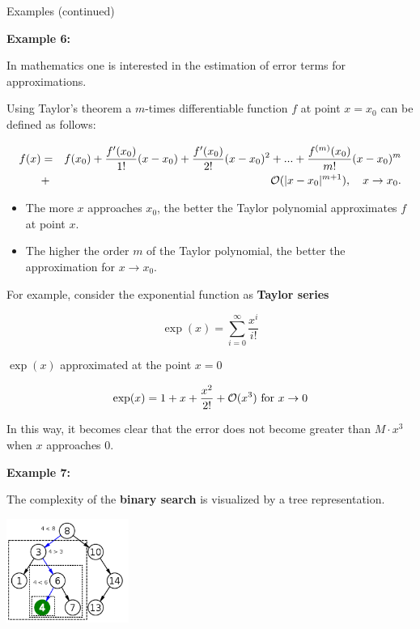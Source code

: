 \documentclass[11pt,compress,t,notes=noshow, xcolor=table]{beamer}
\begin{document}
\begin{vbframe}{Examples (continued)}
\framebreak

\textbf{Example 6:}

In mathematics one is interested in the estimation of error terms for approximations.

Using Taylor's theorem a $m$-times differentiable function $f$ at point $x = x_0$ can be defined as follows:

\begin{footnotesize}
\begin{eqnarray*}
f(x) &=& f(x_0) + \frac{f'(x_0)}{1!}(x - x_0) +  \frac{f'(x_0)}{2!}(x - x_0)^2 + ... +  \frac{f^{(m)}(x_0)}{m!}(x - x_0)^m \\
&+& \mathcal{O}(|x - x_0|^{m + 1}), \quad x\to x_0.
\end{eqnarray*}
\end{footnotesize}

\begin{itemize}
\item The more $x$ approaches $x_0$, the better the Taylor polynomial approximates $f$ at point $x$.
\item The higher the order $m$ of the Taylor polynomial, the better the approximation for $x \to x_0$.
\end{itemize}


\framebreak

For example, consider the exponential function as \textbf{Taylor series}

$$
\exp(x) = \sum_{i=0}^\infty \frac{x^i}{i!}
$$

$\exp(x)$ approximated at the point $x=0$

$$
\exp(x) = 1 + x + \frac{x^2}{2!} + \mathcal{O}(x^3) \text{ for } x \rightarrow 0
$$

In this way, it becomes clear that the error does not become greater than
$M \cdot x^3$ when $x$ approaches $0$.

\framebreak

\textbf{Example 7:}

The complexity of the \textbf{binary search} is visualized by a tree representation.

\begin{center}
  \includegraphics[width=0.3\textwidth]{figure_man/binarysearch.png}
\end{center}


\end{vbframe}
\end{document}
